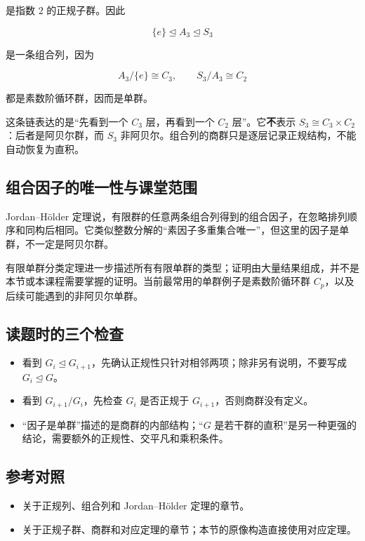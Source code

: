 是指数 $2$ 的正规子群。因此

\[
\{e\}\trianglelefteq A_3\trianglelefteq S_3
\]

是一条组合列，因为

\[
A_3/\{e\}\cong C_3,
\qquad S_3/A_3\cong C_2
\]

都是素数阶循环群，因而是单群。

这条链表达的是“先看到一个 $C_3$ 层，再看到一个 $C_2$ 层”。它\textbf{不}表示 $S_3\cong C_3\times C_2$：后者是阿贝尔群，而 $S_3$ 非阿贝尔。组合列的商群只是逐层记录正规结构，不能自动恢复为直积。

\subsection{组合因子的唯一性与课堂范围}


Jordan--Hölder 定理说，有限群的任意两条组合列得到的组合因子，在忽略排列顺序和同构后相同。它类似整数分解的“素因子多重集合唯一”，但这里的因子是单群，不一定是阿贝尔群。

有限单群分类定理进一步描述所有有限单群的类型；证明由大量结果组成，并不是本节或本课程需要掌握的证明。当前最常用的单群例子是素数阶循环群 $C_p$，以及后续可能遇到的非阿贝尔单群。

\subsection{读题时的三个检查}


\begin{itemize}
\item 看到 $G_i\trianglelefteq G_{i+1}$，先确认正规性只针对相邻两项；除非另有说明，不要写成 $G_i\trianglelefteq G$。
\item 看到 $G_{i+1}/G_i$，先检查 $G_i$ 是否正规于 $G_{i+1}$，否则商群没有定义。
\item “因子是单群”描述的是商群的内部结构；“$G$ 是若干群的直积”是另一种更强的结论，需要额外的正规性、交平凡和乘积条件。
\end{itemize}


\subsection{参考对照}


\begin{itemize}
\item [DF] 关于正规列、组合列和 Jordan--Hölder 定理的章节。
\item [DS] 关于正规子群、商群和对应定理的章节；本节的原像构造直接使用对应定理。
\end{itemize}
